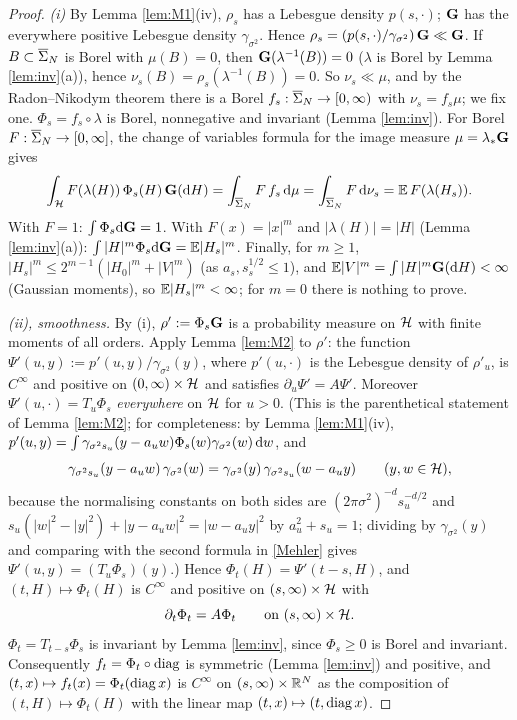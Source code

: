 \begin{proof}
\emph{(i)} By Lemma \ref{lem:M1}(iv), $\rho_s$ has a Lebesgue density $p(s,\cdot)$; $\mathbf{G}$ has the everywhere positive Lebesgue density $\gamma_{\sigma^2}$. Hence $\rho_s=(p(s,\cdot)/\gamma_{\sigma^2})\,\mathbf{G}\ll\mathbf{G}$.
If $B\subset\overline{\Sigma}_N$ is Borel with $\mu(B)=0$, then $\mathbf{G}(\lambda^{-1}(B))=0$ ($\lambda$ is Borel by Lemma \ref{lem:inv}(a)), hence $\nu_s(B)=\rho_s(\lambda^{-1}(B))=0$. So $\nu_s\ll\mu$, and by the Radon--Nikodym theorem there is a Borel $f_s:\overline{\Sigma}_N\to[0,\infty)$ with $\nu_s=f_s\mu$; we fix one.
$\Phi_s=f_s\circ\lambda$ is Borel, nonnegative and invariant (Lemma \ref{lem:inv}). For Borel $F:\overline{\Sigma}_N\to[0,\infty]$, the change of variables formula for the image measure $\mu=\lambda_*\mathbf{G}$ gives
\begin{equation}\label{c4:push}
\int_{\mathcal{H}} F(\lambda(H))\,\Phi_s(H)\,\mathbf{G}(\mathrm{d} H)=\int_{\overline{\Sigma}_N}F\,f_s\,\mathrm{d}\mu=\int_{\overline{\Sigma}_N}F\,\mathrm{d}\nu_s=\mathbb{E}\,F(\lambda(H_s)).
\end{equation}
With $F=1$: $\int\Phi_s\mathrm{d}\mathbf{G}=1$. With $F(x)=|x|^m$ and $|\lambda(H)|=|H|$ (Lemma \ref{lem:inv}(a)): $\int|H|^m\Phi_s\mathrm{d}\mathbf{G}=\mathbb{E}|H_s|^m$.
Finally, for $m\ge1$, $|H_s|^m\le2^{m-1}(|H_0|^m+|V|^m)$ (as $a_s,s_s^{1/2}\le1$), and $\mathbb{E}|V|^m=\int|H|^m\mathbf{G}(\mathrm{d} H)<\infty$ (Gaussian moments), so $\mathbb{E}|H_s|^m<\infty$; for $m=0$ there is nothing to prove.

\emph{(ii), smoothness.} By (i), $\rho':=\Phi_s\mathbf{G}$ is a probability measure on $\mathcal{H}$ with finite moments of all orders. Apply Lemma \ref{lem:M2} to $\rho'$: the function $\Psi'(u,y):=p'(u,y)/\gamma_{\sigma^2}(y)$, where $p'(u,\cdot)$ is the Lebesgue density of $\rho'_u$, is $C^\infty$ and positive on $(0,\infty)\times\mathcal{H}$ and satisfies $\partial_u\Psi'=A\Psi'$.
Moreover $\Psi'(u,\cdot)=T_u\Phi_s$ \emph{everywhere} on $\mathcal{H}$ for $u>0$. (This is the parenthetical statement of Lemma \ref{lem:M2}; for completeness: by Lemma \ref{lem:M1}(iv), $p'(u,y)=\int\gamma_{\sigma^2s_u}(y-a_uw)\Phi_s(w)\gamma_{\sigma^2}(w)\,\mathrm{d} w$, and
\[\gamma_{\sigma^2s_u}(y-a_uw)\,\gamma_{\sigma^2}(w)=\gamma_{\sigma^2}(y)\,\gamma_{\sigma^2s_u}(w-a_uy)\qquad(y,w\in\mathcal{H}),\]
because the normalising constants on both sides are $(2\pi\sigma^2)^{-d}s_u^{-d/2}$ and $s_u(|w|^2-|y|^2)+|y-a_uw|^2=|w-a_uy|^2$ by $a_u^2+s_u=1$; dividing by $\gamma_{\sigma^2}(y)$ and comparing with the second formula in \eqref{Mehler} gives $\Psi'(u,y)=(T_u\Phi_s)(y)$.)
Hence $\Phi_t(H)=\Psi'(t-s,H)$, and $(t,H)\mapsto\Phi_t(H)$ is $C^\infty$ and positive on $(s,\infty)\times\mathcal{H}$ with
\begin{equation}\label{c4:PhiPDE}
\partial_t\Phi_t=A\Phi_t\qquad\text{on }(s,\infty)\times\mathcal{H} .
\end{equation}
$\Phi_t=T_{t-s}\Phi_s$ is invariant by Lemma \ref{lem:inv}, since $\Phi_s\ge0$ is Borel and invariant. Consequently $f_t=\Phi_t\circ\operatorname{diag}$ is symmetric (Lemma \ref{lem:inv}) and positive, and $(t,x)\mapsto f_t(x)=\Phi_t(\operatorname{diag} x)$ is $C^\infty$ on $(s,\infty)\times\mathbb{R}^N$ as the composition of $(t,H)\mapsto\Phi_t(H)$ with the linear map $(t,x)\mapsto(t,\operatorname{diag} x)$.


\end{proof}
